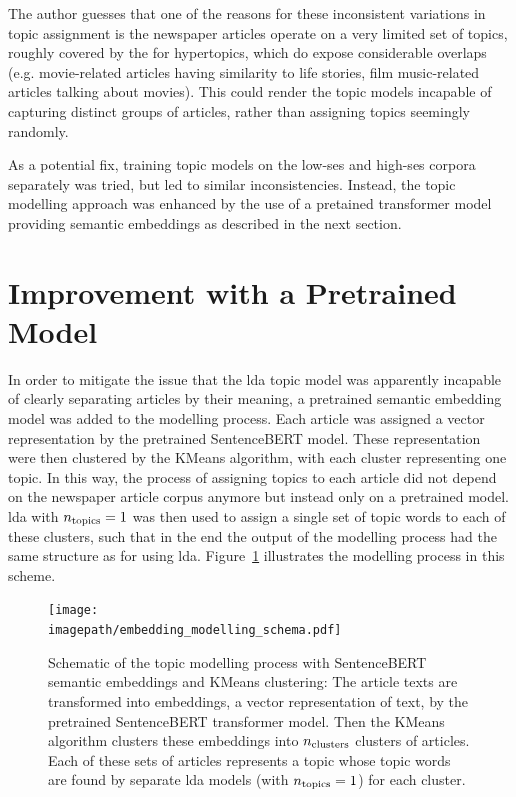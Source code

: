 The author guesses that one of the reasons for these inconsistent variations in topic assignment is the newspaper articles operate on a very limited set of topics, roughly covered by the for hypertopics, which do expose considerable overlaps (e.g. movie-related articles having similarity to life stories, film music-related articles talking about movies). This could render the topic models incapable of capturing distinct groups of articles, rather than assigning topics seemingly randomly.

As a potential fix, training topic models on the low-\gls{ses} and high-\gls{ses} corpora separately was tried, but led to similar inconsistencies. Instead, the topic modelling approach was enhanced by the use of a pretained transformer model providing semantic embeddings as described in the next section.

\section{Improvement with a Pretrained Model}
In order to mitigate the issue that the \gls{lda} topic model was apparently incapable of clearly separating articles by their meaning, a pretrained semantic embedding model was added to the modelling process. Each article was assigned a vector representation by the pretrained SentenceBERT model. These representation were then clustered by the KMeans algorithm, with each cluster representing one topic. In this way, the process of assigning topics to each article did not depend on the newspaper article corpus anymore but instead only on a pretrained model. \gls{lda} with $n_\text{topics}=1$ was then used to assign a single set of topic words to each of these clusters, such that in the end the output of the modelling process had the same structure as for using \gls{lda}. Figure~\ref{fig:embedding_modelling_schema} illustrates the modelling process in this scheme.

\begin{figure}
    \centering
    \texttt{[image: \\imagepath/embedding\_modelling\_schema.pdf]}
    \caption{Schematic of the topic modelling process with SentenceBERT semantic embeddings and KMeans clustering: The article texts are transformed into embeddings, a vector representation of text, by the pretrained SentenceBERT transformer model. Then the KMeans algorithm clusters these embeddings into $n_\text{clusters}$ clusters of articles. Each of these sets of articles represents a topic whose topic words are found by separate \gls{lda} models (with $n_\text{topics}=1$) for each cluster.}\label{fig:embedding_modelling_schema}
\end{figure}

